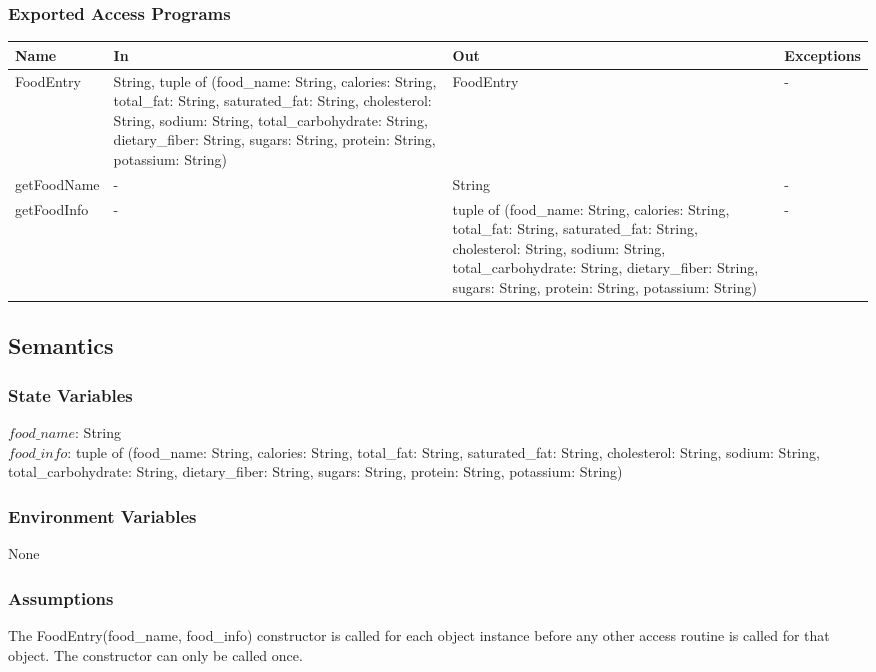 \documentclass[12pt, titlepage]{article}
\begin{document}
\subsubsection{Exported Access Programs}
\begin{center}
	\begin{tabular}{p{3cm} p{5cm} p{5cm} p{2cm}}
		\hline
		\textbf{Name} & \textbf{In} & \textbf{Out} & \textbf{Exceptions} \\
		\hline
		FoodEntry & String, tuple of (food\_name: String, calories: String, total\_fat: String, saturated\_fat: String, cholesterol: String, sodium: String, total\_carbohydrate: String, dietary\_fiber: String, sugars: String, protein: String, potassium: String) & FoodEntry & - \\
		getFoodName & - & String & - \\
		getFoodInfo & - & tuple of (food\_name: String, calories: String, total\_fat: String, saturated\_fat: String, cholesterol: String, sodium: String, total\_carbohydrate: String, dietary\_fiber: String, sugars: String, protein: String, potassium: String) & - \\
		\hline
	\end{tabular}
\end{center}
\subsection{Semantics}
\subsubsection{State Variables}
$food\_name$: String\\
$food\_info$: tuple of (food\_name: String, calories: String, total\_fat: String, saturated\_fat: String, cholesterol: String, sodium: String, total\_carbohydrate: String, dietary\_fiber: String, sugars: String, protein: String, potassium: String)
\subsubsection{Environment Variables}
None
\subsubsection{Assumptions}
The FoodEntry(food\_name, food\_info) constructor is called for each object instance before any other access
routine is called for that object. The constructor can only be called once.
\end{document}
